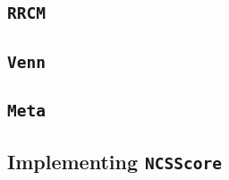 \documentclass[twoside,11pt]{article}
\begin{document}
\begin{appendices}
  \subsection{\texttt{RRCM}}
  \subsection{\texttt{Venn}}
  \subsection{\texttt{Meta}}
  \subsection{Implementing \texttt{NCSScore}}

\end{appendices}


\end{document}
